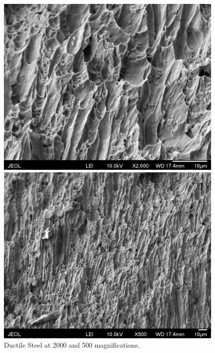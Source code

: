 \documentclass{article}
\begin{document}
\begin{figure}[h]
	\begin{minipage}{0.5\textwidth}
		\centering
		\includegraphics[scale=0.5]{steel_ductile_2kx_e.png}
	\end{minipage}
	\begin{minipage}{0.5\textwidth}
		\centering
		\includegraphics[scale=0.5]{steel_ductile_500x_e.png}
	\end{minipage}
	\caption{Ductile Steel at 2000 and 500 magnifications.}
\end{figure}
\end{document}
